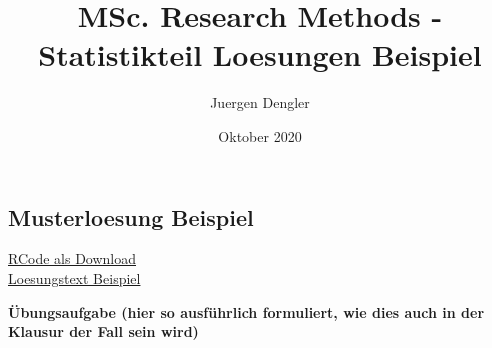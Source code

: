 \documentclass[
]{article}
\title{MSc. Research Methods - Statistikteil Loesungen Beispiel}
\author{Juergen Dengler}
\date{Oktober 2020}
\begin{document}
\maketitle

\hypertarget{musterloesung-beispiel}{%
\subsection{Musterloesung Beispiel}\label{musterloesung-beispiel}}

\href{14_Statistik2/RFiles/Loesung_Beispiel_v.01.R}{RCode als
Download}\\
\href{Statistik_Übungslösung_Beispiel.pdf}{Loesungstext Beispiel}

\textbf{Übungsaufgabe (hier so ausführlich formuliert, wie dies auch in
der Klausur der Fall sein wird)}
\end{document}

